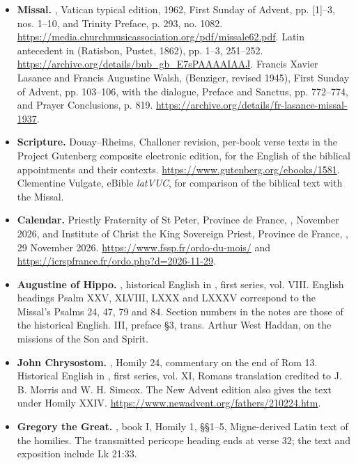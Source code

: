 \begin{itemize}
\item \textbf{Missal.} , Vatican typical edition, 1962, First Sunday of Advent, pp. [1]--3, nos. 1--10, and Trinity Preface, p. 293, no. 1082. \url{https://media.churchmusicassociation.org/pdf/missale62.pdf}. Latin antecedent in  (Ratisbon, Pustet, 1862), pp. 1--3, 251--252. \url{https://archive.org/details/bub_gb_E7sPAAAAIAAJ}. Francis Xavier Lasance and Francis Augustine Walsh,  (Benziger, revised 1945), First Sunday of Advent, pp. 103--106, with the dialogue, Preface and Sanctus, pp. 772--774, and Prayer Conclusions, p. 819. \url{https://archive.org/details/fr-lasance-missal-1937}.
\item \textbf{Scripture.} Douay--Rheims, Challoner revision, per-book verse texts in the Project Gutenberg composite electronic edition, for the English of the biblical appointments and their contexts. \url{https://www.gutenberg.org/ebooks/1581}. Clementine Vulgate, eBible \emph{latVUC}, for comparison of the biblical text with the Missal.
\item \textbf{Calendar.} Priestly Fraternity of St Peter, Province de France, , November 2026, and Institute of Christ the King Sovereign Priest, Province de France, , 29 November 2026. \url{https://www.fssp.fr/ordo-du-mois/} and \url{https://icrspfrance.fr/ordo.php?d=2026-11-29}.
\item \textbf{Augustine of Hippo.} , historical English in , first series, vol. VIII. English headings Psalm XXV, XLVIII, LXXX and LXXXV correspond to the Missal's Psalms 24, 47, 79 and 84. Section numbers in the notes are those of the historical English.  III, preface §3, trans. Arthur West Haddan, on the missions of the Son and Spirit.
\item \textbf{John Chrysostom.} , Homily 24, commentary on the end of Rom 13. Historical English in , first series, vol. XI, Romans translation credited to J. B. Morris and W. H. Simcox. The New Advent edition also gives the text under Homily XXIV. \url{https://www.newadvent.org/fathers/210224.htm}.
\item \textbf{Gregory the Great.} , book I, Homily 1, §§1--5, Migne-derived Latin text of the homilies. The transmitted pericope heading ends at verse 32; the text and exposition include Lk 21:33.

\end{itemize}
